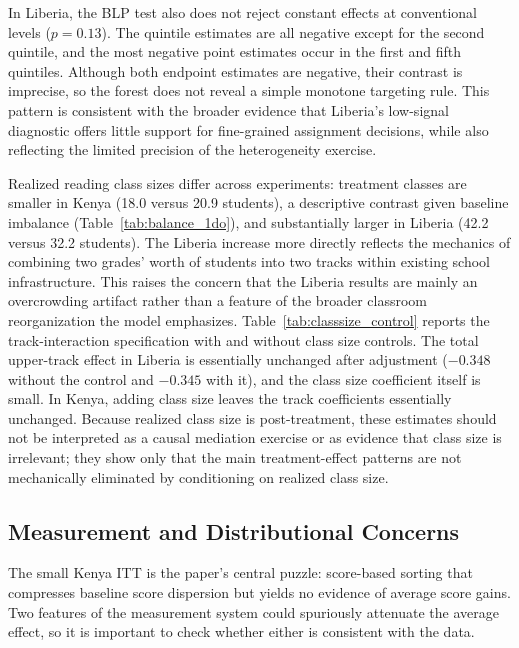 \documentclass[11pt]{article}
\begin{document}
In Liberia, the BLP test also does not reject constant effects at conventional levels ($p = 0.13$). The quintile estimates are all negative except for the second quintile, and the most negative point estimates occur in the first and fifth quintiles. Although both endpoint estimates are negative, their contrast is imprecise, so the forest does not reveal a simple monotone targeting rule. This pattern is consistent with the broader evidence that Liberia's low-signal diagnostic offers little support for fine-grained assignment decisions, while also reflecting the limited precision of the heterogeneity exercise.

Realized reading class sizes differ across experiments: treatment classes are smaller in Kenya (18.0 versus 20.9 students), a descriptive contrast given baseline imbalance (Table~\ref{tab:balance_1do}), and substantially larger in Liberia (42.2 versus 32.2 students). The Liberia increase more directly reflects the mechanics of combining two grades' worth of students into two tracks within existing school infrastructure. This raises the concern that the Liberia results are mainly an overcrowding artifact rather than a feature of the broader classroom reorganization the model emphasizes. Table~\ref{tab:classsize_control} reports the track-interaction specification with and without class size controls. The total upper-track effect in Liberia is essentially unchanged after adjustment ($-0.348$ without the control and $-0.345$ with it), and the class size coefficient itself is small. In Kenya, adding class size leaves the track coefficients essentially unchanged. Because realized class size is post-treatment, these estimates should not be interpreted as a causal mediation exercise or as evidence that class size is irrelevant; they show only that the main treatment-effect patterns are not mechanically eliminated by conditioning on realized class size.

\subsection{Measurement and Distributional Concerns}

The small Kenya ITT is the paper's central puzzle: score-based sorting that compresses baseline score dispersion but yields no evidence of average score gains. Two features of the measurement system could spuriously attenuate the average effect, so it is important to check whether either is consistent with the data.
\end{document}

